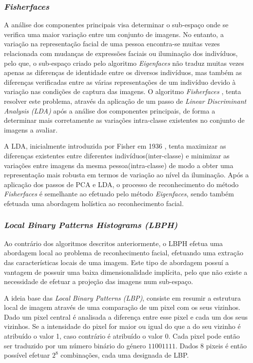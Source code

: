 \subsubsection{\textit{Fisherfaces}}
A análise dos componentes principais visa determinar o sub-espaço onde se verifica uma maior variação entre um conjunto de imagens. No entanto, a variação na representação facial de uma pessoa encontra-se muitas vezes relacionada com mudanças de expressões faciais ou iluminação dos indivíduos, pelo que, o sub-espaço criado pelo algoritmo \textit{Eigenfaces} não traduz muitas vezes apenas as diferenças de identidade entre os diversos indivíduos, mas também as diferenças verificadas entre as várias representações de um indivíduo devido à variação nas condições de captura das imagens. O algoritmo \textit{Fisherfaces} \cite{Belhumeur1997, Etemad1997, Zhao1998}, tenta resolver este problema, através da aplicação de um passo de \textit{Linear Discriminant Analysis (LDA)} após a análise dos componentes principais, de forma a determinar mais corretamente as variações intra-classe existentes no conjunto de imagens a avaliar.

A LDA, inicialmente introduzida por Fisher em 1936 \cite{FISHER1936}, tenta maximizar as diferenças existentes entre diferentes indivíduos(inter-classe) e minimizar as variações entre imagens da mesma pessoa(intra-classe) de modo a obter uma representação mais robusta em termos de variação ao nível da iluminação. Após a aplicação dos passos de PCA e LDA, o processo de reconhecimento do método \textit{Fisherfaces} é semelhante ao efetuado pelo método \textit{Eigenfaces}, sendo também efetuada uma abordagem holística ao reconhecimento facial.


\subsubsection{\textit{Local Binary Patterns Histograms (LBPH)}}
Ao contrário dos algoritmos descritos anteriormente, o LBPH efetua uma abordagem local ao problema de reconhecimento facial, efetuando uma extração das características locais de uma imagem. Este tipo de abordagem possuí a vantagem de possuir uma baixa dimensionalidade implícita, pelo que não existe a necessidade de efetuar a projeção das imagens num sub-espaço.

A ideia base das \textit{Local Binary Patterns (LBP)}, consiste em resumir a estrutura local de imagem através de uma comparação de um pixel com os seus vizinhos. Dado um pixel central é analisada a diferença entre esse pixel e cada um dos seus vizinhos. Se a intensidade do pixel for maior ou igual do que a do seu vizinho é atribuído o valor 1, caso contrário é atribuído o valor 0. Cada pixel pode então ser traduzido por um número binário do género $11001111$. Dados $8$ pixeis é então possível efetuar $2^8$ combinações, cada uma designada de LBP.

